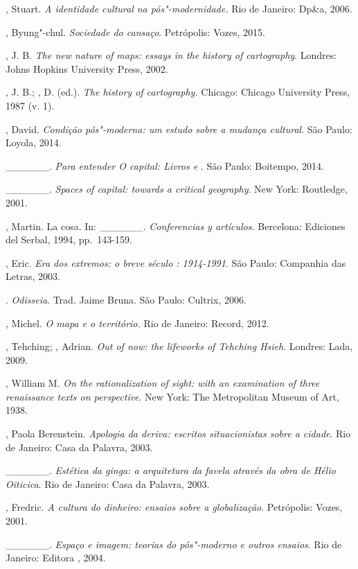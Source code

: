 \begin{Parskip}
, Stuart. \emph{A identidade cultural na pós"-modernidade.} Rio de
Janeiro: Dp\&a, 2006.

, Byung"-chul. \emph{Sociedade do cansaço}. Petrópolis: Vozes, 2015.

, J. B. \emph{The new nature of maps: essays in the history of
cartography}. Londres: Johns Hopkins University Press, 2002.

, J. B.; , D. (ed.). \emph{The history of cartography.}
Chicago: Chicago University Press, 1987 (v. 1).

, David. \emph{Condição pós"-moderna: um estudo sobre a mudança
cultural}. São Paulo: Loyola, 2014.

\_\_\_\_\_\_. \emph{Para entender \emph{O capital}: Livros  e
}. São Paulo: Boitempo, 2014.

\_\_\_\_\_\_. \emph{Spaces of capital: towards a critical
geography}. New York: Routledge, 2001.

, Martin. La cosa. In: \_\_\_\_\_\_. \emph{Conferencias y
artículos.} Bercelona: Ediciones del Serbal, 1994, pp.~143-159.

, Eric. \emph{Era dos extremos: o breve século : 1914-1991}.
São Paulo: Companhia das Letras, 2003.

. \emph{Odisseia}. Trad. Jaime Bruna. São Paulo: Cultrix, 2006.

, Michel. \emph{O mapa e o território.} Rio de Janeiro:
Record, 2012.

, Tehching; , Adrian. \emph{Out of now: the lifeworks
of Tehching Hsieh}. Londres: Lada, 2009.

, William M. \emph{On the rationalization of sight: with an
examination of three renaissance texts on perspective}. New York: The
Metropolitan Museum of Art, 1938.

, Paola Berenstein. \emph{Apologia da deriva: escritos
situacionistas sobre a cidade}. Rio de Janeiro: Casa da Palavra, 2003.

\_\_\_\_\_\_. \emph{Estética da ginga: a arquitetura da favela
através da obra de Hélio Oiticica}. Rio de Janeiro: Casa da Palavra,
2003.

, Fredric. \emph{A cultura do dinheiro: ensaios sobre a
globalização}. Petrópolis: Vozes, 2001.

\_\_\_\_\_\_. \emph{Espaço e imagem: teorias do pós"-moderno e
outros ensaios}. Rio de Janeiro: Editora , 2004.


\end{Parskip}
